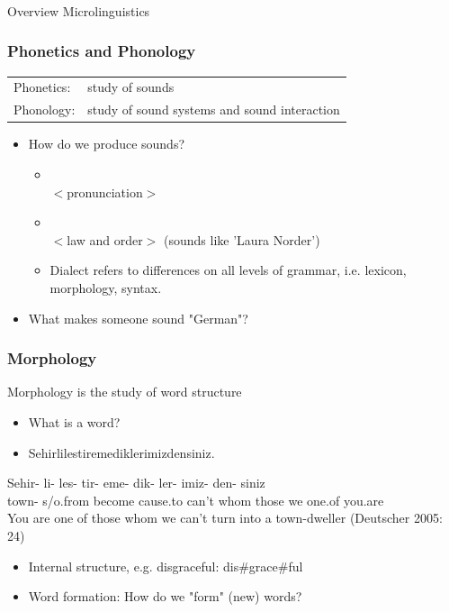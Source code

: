 \documentclass[12pt, table]{beamer}
\begin{document}
\begin{frame}
\frametitle{ }
\begin{center}
Overview Microlinguistics\\
\end{center}
\end{frame}

\begin{frame}
\frametitle{Phonetics and Phonology}
\begin{tabularx}{\textwidth}{l l}
Phonetics: & study of sounds\\
Phonology: & study of sound systems and sound interaction\\
\end{tabularx}
\begin{itemize}
\item How do we produce sounds?\\
\begin{itemize}
\item {}\\
$<$pronunciation$>$
\item {}\\
$<$law and order$>$ (sounds like 'Laura Norder')
\item Dialect refers to differences on all levels of grammar, i.e. lexicon, morphology, syntax.
\end{itemize}
\item What makes someone sound "German"?
\end{itemize}
\end{frame}

\begin{frame}
\frametitle{Morphology}
Morphology is the study of word structure\\
\begin{itemize}
\item What is a word?
\item Sehirlilestiremediklerimizdensiniz.
\end{itemize}
\begin{exe}
\ex 
\gll Sehir- li- les- tir- eme- dik- ler- imiz- den- siniz\\
town- s/o.from become cause.to can't whom those we one.of you.are\\
\trans You are one of those whom we can't turn into a town-dweller (Deutscher 2005: 24)
\end{exe}
\begin{itemize}
\item Internal structure, e.g. disgraceful: dis\#grace\#ful\\
\item Word formation: How do we "form" (new) words?
\end{itemize}
\end{frame}
\end{document}
